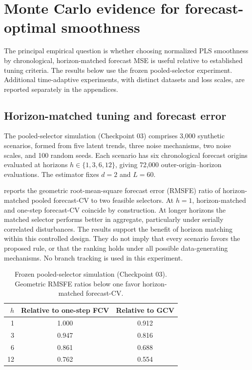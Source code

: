 \section{Monte Carlo evidence for forecast-optimal smoothness}
\label{sec:empirical}

The principal empirical question is whether choosing normalized PLS
smoothness by chronological, horizon-matched forecast MSE is useful
relative to established tuning criteria. The results below use the frozen pooled-selector
experiment. Additional time-adaptive experiments,
with distinct datasets and loss scales, are
reported separately in the appendices.

\subsection{Horizon-matched tuning and forecast error}

The pooled-selector simulation (Checkpoint 03) comprises 3,000 synthetic
scenarios, formed from five latent trends, three noise mechanisms, two noise
scales, and 100 random seeds. Each scenario has six chronological forecast
origins evaluated at horizons $h\in\{1,3,6,12\}$, giving 72,000
outer-origin--horizon evaluations. The estimator fixes $d=2$ and $L=60$.

 reports the geometric root-mean-square forecast error
(RMSFE) ratio of horizon-matched pooled forecast-CV to two feasible selectors.
At $h=1$, horizon-matched and one-step forecast-CV coincide by construction.
At longer horizons the matched selector performs better in aggregate,
particularly under serially correlated disturbances. The results support the benefit of horizon matching within
this controlled design. They do not imply that every scenario
favors the proposed rule, or that the ranking holds under
all possible data-generating mechanisms. No branch tracking
is used in this experiment.

\begin{table}[t]
\centering
\caption{Frozen pooled-selector simulation (Checkpoint 03). Geometric RMSFE
ratios below one favor horizon-matched forecast-CV.}
\label{tab:cp03}
\begin{tabular}{@{}rcc@{}}
\toprule
$h$ & Relative to one-step FCV & Relative to GCV \\
\midrule
1  & 1.000 & 0.912 \\
3  & 0.947 & 0.816 \\
6  & 0.861 & 0.688 \\
12 & 0.762 & 0.554 \\
\bottomrule
\end{tabular}
\end{table}

